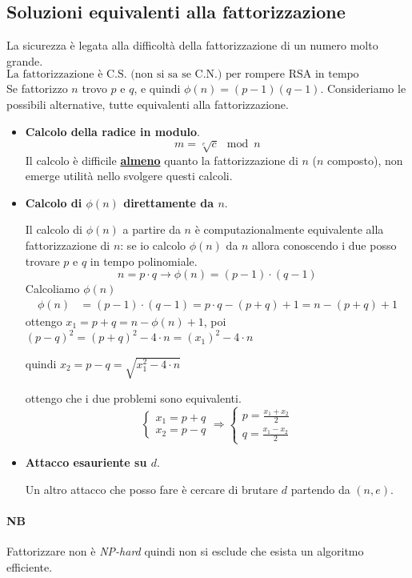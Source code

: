 \subsection{Soluzioni equivalenti alla fattorizzazione}
La sicurezza è legata alla difficoltà della fattorizzazione di un numero molto grande. 
\[\boxed{\text{La fattorizzazione è C.S. (non si sa se  C.N.) per rompere RSA in tempo polinomiale}}\]
Se fattorizzo $n$ trovo $p$ e $q$, e quindi $\phi(n)=(p-1)(q-1)$. 
Consideriamo le possibili alternative, tutte equivalenti alla fattorizzazione.
\begin{itemize}
	\item \textbf{Calcolo della radice in modulo}. 
	$$m = \sqrt[e]{c} \mod n$$
	Il calcolo è difficile \textbf{\underline{almeno}} quanto la fattorizzazione di $n$ ($n$ composto), non emerge utilità nello svolgere questi calcoli.
	\item \textbf{Calcolo di $\phi(n)$ direttamente da $n$}.
	
	Il calcolo di $\phi(n)$ a partire da $n$ è computazionalmente equivalente alla fattorizzazione di $n$: se io calcolo $\phi(n)$ da $n$ allora conoscendo i due posso trovare $p$ e $q$ in tempo polinomiale. 
	$$\boxed{n = p \cdot q \xrightarrow{} \phi(n) = (p-1) \cdot (q-1)}$$
	Calcoliamo $\phi(n)$
	\begin{align*}
		\phi(n) &= (p-1) \cdot (q-1)= p \cdot q - (p+q) + 1 = n - (p+q) + 1
	\end{align*}
	ottengo $ x_1 = p+q = n - \phi(n) + 1 $, 	poi $ (p-q)^2 = (p+q)^2 - 4 \cdot n = (x_1)^2 - 4 \cdot n $
	
	quindi $ x_2 = p - q = \sqrt{x_1^{2} - 4 \cdot n}$
	
	ottengo che i due problemi sono equivalenti.
	\[
	\begin{cases}
		x_1 = p + q \\ 
		x_2 = p - q
	\end{cases}	\Longrightarrow \begin{cases}
		p = \frac{x_1 + x_2}{2} \\
		q = \frac{x_1 - x_2}{2}
	\end{cases}
	\]
	
	\item \textbf{Attacco esauriente su $d$}. 
	
	Un altro attacco che posso fare è cercare di brutare $d$ partendo da $(n,e)$.
\end{itemize}
\paragraph{NB} Fattorizzare non è \emph{NP-hard} quindi non si esclude che esista un algoritmo efficiente.
\pagebreak 


